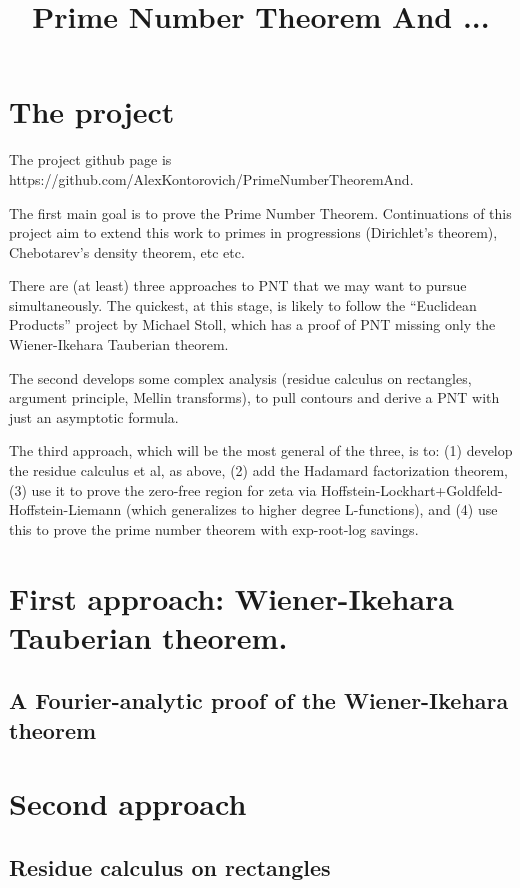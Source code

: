 \documentclass{report}
\title{Prime Number Theorem And ...}
\theoremstyle{definition}
\begin{document}
\maketitle

\chapter{The project}

The project github page is https://github.com/AlexKontorovich/PrimeNumberTheoremAnd.

The first main goal is to prove the Prime Number Theorem. Continuations of this project aim to extend
this work to primes in progressions (Dirichlet's theorem), Chebotarev's density theorem, etc
etc.

There are (at least) three approaches to PNT that we may want to pursue simultaneously. The quickest, at this stage, is likely to
follow
 the ``Euclidean Products'' project by Michael Stoll, which has a proof of PNT missing only the Wiener-Ikehara Tauberian theorem.

The second develops some complex analysis (residue calculus on rectangles, argument principle, Mellin transforms), to pull contours and derive a PNT with just an asymptotic formula.

The third approach, which will be the most general of the three, is to: (1) develop the residue calculus et al, as above, (2) add the Hadamard factorization theorem, (3) use it to prove the zero-free region for zeta via Hoffstein-Lockhart+Goldfeld-Hoffstein-Liemann (which generalizes to higher degree L-functions), and (4) use this to prove the prime number theorem with exp-root-log savings.

\chapter{First approach: Wiener-Ikehara Tauberian theorem.}

\section{A Fourier-analytic proof of the Wiener-Ikehara theorem}


\chapter{Second approach}

\section{Residue calculus on rectangles}

\end{document}
